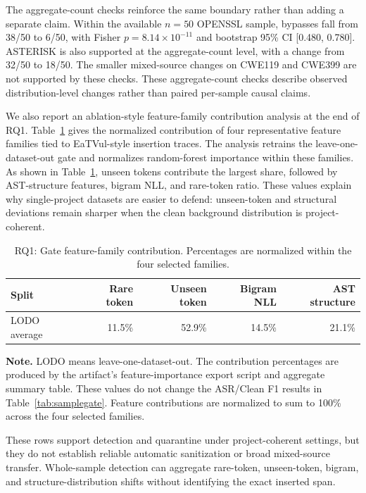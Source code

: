 \documentclass[letterpaper,twocolumn,10pt,twoside]{article}
\newcommand{\dataset}[1]{\textsc{#1}}
\begin{document}
The aggregate-count checks reinforce the same boundary rather than adding a separate claim. Within the available $n=50$ \dataset{OPENSSL} sample, bypasses fall from 38/50 to 6/50, with Fisher $p=8.14{\times}10^{-11}$ and bootstrap 95\% CI [0.480, 0.780]. \dataset{ASTERISK} is also supported at the aggregate-count level, with a change from 32/50 to 18/50. The smaller mixed-source changes on \dataset{CWE119} and \dataset{CWE399} are not supported by these checks. These aggregate-count checks describe observed distribution-level changes rather than paired per-sample causal claims.

We also report an ablation-style feature-family contribution analysis at the end of RQ1. Table~\ref{tab:gateablation} gives the normalized contribution of four representative feature families tied to EaTVul-style insertion traces. The analysis retrains the leave-one-dataset-out gate and normalizes random-forest importance within these families. As shown in Table~\ref{tab:gateablation}, unseen tokens contribute the largest share, followed by AST-structure features, bigram NLL, and rare-token ratio. These values explain why single-project datasets are easier to defend: unseen-token and structural deviations remain sharper when the clean background distribution is project-coherent.

\begin{table}[tbp]
\centering
\caption{RQ1: Gate feature-family contribution. Percentages are normalized within the four selected families.}
\label{tab:gateablation}
\begin{tabular}{lrrrr}
\toprule
Split & Rare token & Unseen token & Bigram NLL & AST structure \\
\midrule
LODO average & 11.5\% & 52.9\% & 14.5\% & 21.1\% \\
\bottomrule
\end{tabular}
\vspace{2pt}
\par\footnotesize\textbf{Note.} LODO means leave-one-dataset-out. The contribution percentages are produced by the artifact's feature-importance export script and aggregate summary table. These values do not change the ASR/Clean F1 results in Table~\ref{tab:samplegate}. Feature contributions are normalized to sum to 100\% across the four selected families.
\end{table}

These rows support detection and quarantine under project-coherent settings, but they do not establish reliable automatic sanitization or broad mixed-source transfer. Whole-sample detection can aggregate rare-token, unseen-token, bigram, and structure-distribution shifts without identifying the exact inserted span.
\end{document}
